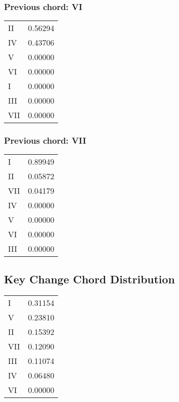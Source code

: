 \subsubsection*{Previous chord: VI}


\begin{tabular}{l l}
II & 0.56294 \\
IV & 0.43706 \\
V & 0.00000 \\
VI & 0.00000 \\
I & 0.00000 \\
III & 0.00000 \\
VII & 0.00000 \\
\end{tabular}


\subsubsection*{Previous chord: VII}


\begin{tabular}{l l}
I & 0.89949 \\
II & 0.05872 \\
VII & 0.04179 \\
IV & 0.00000 \\
V & 0.00000 \\
VI & 0.00000 \\
III & 0.00000 \\
\end{tabular}

\subsection{Key Change Chord Distribution}
\begin{tabular}{l l}
I & 0.31154 \\
V & 0.23810 \\
II & 0.15392 \\
VII & 0.12090 \\
III & 0.11074 \\
IV & 0.06480 \\
VI & 0.00000 \\
\end{tabular}
